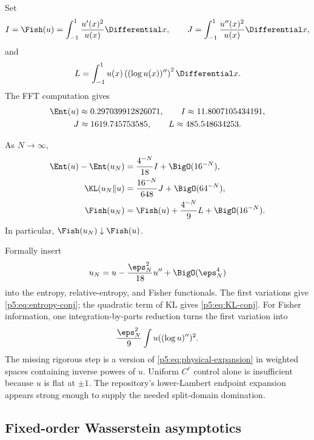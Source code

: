 \documentclass[11pt,oneside]{article}
\numberwithin{equation}{section}
\theoremstyle{definition}
\theoremstyle{remark}
\begin{document}
Set
\begin{equation}
 I=\Fish(u)=\int_{-1}^{1}\frac{u'(x)^2}{u(x)}\Differential x,
 \qquad
 J=\int_{-1}^{1}\frac{u''(x)^2}{u(x)}\Differential x,
 \label{p5:eq:I-J}
\end{equation}
and
\begin{equation}
 L=\int_{-1}^{1}u(x)\left((\log u(x))''\right)^2\Differential x.
 \label{p5:eq:L-info}
\end{equation}
The FFT computation gives
\begin{equation}
\begin{gathered}
 \Ent(u)\approx0.297039912826071,
 \qquad I\approx11.8007105434191,\\
 J\approx1619.745753585,
 \qquad L\approx485.548634253.
\end{gathered}
 \label{p5:eq:numeric-info-constants}
\end{equation}

\begin{conjecture}
As $N\to\infty$,
\begin{align}
 \Ent(u)-\Ent(u_N)
 &=\frac{4^{-N}}{18}I+\BigO(16^{-N}),
 \label{p5:eq:entropy-conj}\\
 \KL(u_N\Vert u)
 &=\frac{16^{-N}}{648}J+\BigO(64^{-N}),
 \label{p5:eq:KL-conj}\\
 \Fish(u_N)
 &=\Fish(u)+\frac{4^{-N}}9L+\BigO(16^{-N}).
 \label{p5:eq:fisher-conj}
\end{align}
In particular, $\Fish(u_N)\downarrow\Fish(u)$.
\end{conjecture}

\begin{proofidea}
Formally insert
\[
 u_N=u-\frac{\eps_N^2}{18}u''+\BigO(\eps_N^4)
\]
into the entropy, relative-entropy, and Fisher functionals.  The first variations give \eqref{p5:eq:entropy-conj}; the quadratic term of KL gives \eqref{p5:eq:KL-conj}.  For Fisher information, one integration-by-parts reduction turns the first variation into
\[
 \frac{\eps_N^2}{9}\int u((\log u)'')^2.
\]
The missing rigorous step is a version of \eqref{p5:eq:physical-expansion} in weighted spaces containing inverse powers of $u$.  Uniform $C^r$ control alone is insufficient because $u$ is flat at $\pm1$.  The repository's lower-Lambert endpoint expansion appears strong enough to supply the needed split-domain domination.
\end{proofidea}

\subsection{Fixed-order Wasserstein asymptotics}
\end{document}
